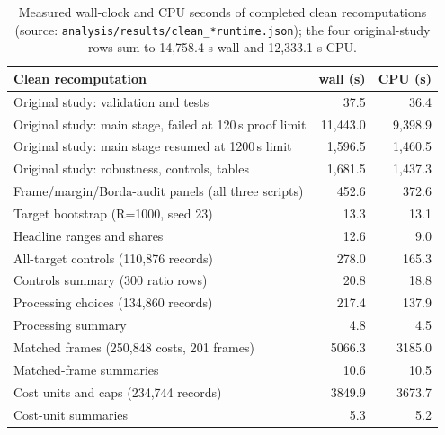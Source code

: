 \begin{table}[h]
\caption{Measured wall-clock and CPU seconds of completed clean recomputations (source: \texttt{analysis/results/clean\_*runtime.json}); the four original-study rows sum to 14{,}758.4 s wall and 12{,}333.1 s CPU.}
\label{tab:times}
\centering\footnotesize
\begin{tabular}{@{}lrr@{}}
\toprule
Clean recomputation & wall (s) & CPU (s)\\
\midrule
Original study: validation and tests & 37.5 & 36.4\\
Original study: main stage, failed at 120\,s proof limit & 11{,}443.0 & 9{,}398.9\\
Original study: main stage resumed at 1200\,s limit & 1{,}596.5 & 1{,}460.5\\
Original study: robustness, controls, tables & 1{,}681.5 & 1{,}437.3\\
Frame/margin/Borda-audit panels (all three scripts) & 452.6 & 372.6\\
Target bootstrap (R=1000, seed 23) & 13.3 & 13.1\\
Headline ranges and shares & 12.6 & 9.0\\
All-target controls (110{,}876 records) & 278.0 & 165.3\\
Controls summary (300 ratio rows) & 20.8 & 18.8\\
Processing choices (134{,}860 records) & 217.4 & 137.9\\
Processing summary & 4.8 & 4.5\\
Matched frames (250{,}848 costs, 201 frames) & 5066.3 & 3185.0\\
Matched-frame summaries & 10.6 & 10.5\\
Cost units and caps (234{,}744 records) & 3849.9 & 3673.7\\
Cost-unit summaries & 5.3 & 5.2\\
\bottomrule
\end{tabular}
\end{table}
